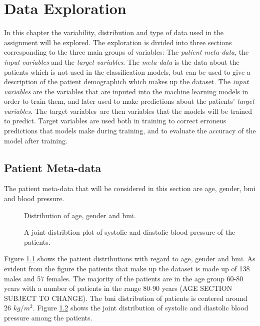 \chapter{Data Exploration} \label{chap:data}

In this chapter the variability, distribution and type of data used in the assignment will be explored. 
The exploration is divided into three sections corresponding to the three main groups of variables: 
The \textit{patient meta-data}, the \textit{input variables} and the \textit{target variables}. 
The \textit{meta-data} is the data about the patients which is not used in the classification models, 
but can be used to give a description of the patient demographich which makes up the dataset. 
The \textit{input variables} are the variables that are inputed into the machine learning models in order to train them, 
and later used to make predictions about the patients' \textit{target variables}. 
The target variables are then variables that the models will be trained to predict. 
Target variables are used both in training to correct erroneus predictions that models make during training, and to evaluate the accuracy of the model after training. \bigskip

\section{Patient Meta-data} \label{sec:metadata}
The patient meta-data that will be considered in this section are age, gender, \acrfull{bmi} and blood pressure.

\begin{figure}
    \centering
    
    \caption{Distribution of age, gender and \acrshort{bmi}.}
    \label{fig:meta_dist4}
\end{figure}

\begin{figure}
    \centering
    
    \caption{A joint distribtion plot of systolic and diastolic blood pressure of the patients.}
    \label{fig:bp_dist}
\end{figure}

Figure \ref{fig:meta_dist4} shows the patient distributions with regard to age, gender and \acrshort{bmi}. 
As evident from the figure the patients that make up the dataset is made up of 138 males and 57 females. 
The majority of the patients are in the age group 60-80 years with a number of patients in the range 80-90 years (AGE SECTION SUBJECT TO CHANGE). 
The \acrshort{bmi} distribution of patients is centered around 26 $kg/m^2$. 
Figure \ref{fig:bp_dist} shows the joint distribution of systolic and diastolic blood pressure among the patients. \bigskip

